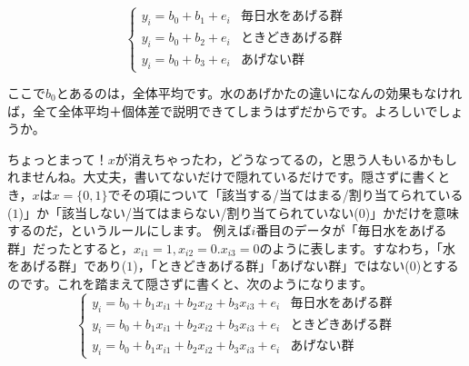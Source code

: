 \documentclass{ltjbook}
\begin{document}
\[
\label{eq13_01}
  \begin{cases}
    y_i = b_0 + b_1 + e_i & \mbox{毎日水をあげる群}\\
    y_i = b_0 + b_2 + e_i & \mbox{ときどきあげる群}\\
    y_i = b_0 + b_3 + e_i & \mbox{あげない群}
  \end{cases}
\]

ここで$b_0$とあるのは，全体平均です。水のあげかたの違いになんの効果もなければ，全て全体平均＋個体差で説明できてしまうはずだからです。よろしいでしょうか。

ちょっとまって！$x$が消えちゃったわ，どうなってるの，と思う人もいるかもしれませんね。大丈夫，書いてないだけで隠れているだけです。隠さずに書くとき，$x$は$x=\{0,1\}$でその項について「該当する/当てはまる/割り当てられている($1$)」か「該当しない/当てはまらない/割り当てられていない($0$)」かだけを意味するのだ，というルールにします。
例えば$i$番目のデータが「毎日水をあげる群」だったとすると，$x_{i1}=1,x_{i2}=0.x_{i3}=0$のように表します。すなわち，「水をあげる群」であり($1$)，「ときどきあげる群」「あげない群」ではない($0$)とするのです。これを踏まえて隠さずに書くと、次のようになります。
\[
\label{eq13_01b}
  \begin{cases}
    y_i = b_0 + b_1x_{i1} + b_2x_{i2} + b_3x_{i3} + e_i & \mbox{毎日水をあげる群}\\
    y_i = b_0 + b_1x_{i1} + b_2x_{i2} + b_3x_{i3} + e_i & \mbox{ときどきあげる群}\\
    y_i = b_0 + b_1x_{i1} + b_2x_{i2} + b_3x_{i3} + e_i & \mbox{あげない群}
  \end{cases}
\]
\end{document}
